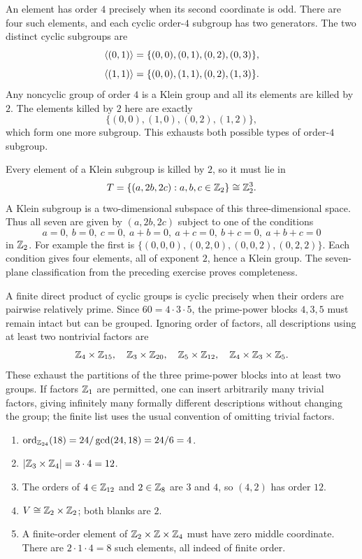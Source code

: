 An element has order $4$ precisely when its second coordinate is odd. There are four such elements, and each cyclic order-$4$ subgroup has two generators. The two distinct cyclic subgroups are
\[\langle (0,1)\rangle=\{(0,0),(0,1),(0,2),(0,3)\},\]
\[\langle (1,1)\rangle=\{(0,0),(1,1),(0,2),(1,3)\}.\]
Any noncyclic group of order $4$ is a Klein group and all its elements are killed by $2$. The elements killed by $2$ here are exactly
\[\{(0,0),(1,0),(0,2),(1,2)\},\]
which form one more subgroup. This exhausts both possible types of order-$4$ subgroup.

Every element of a Klein subgroup is killed by $2$, so it must lie in
\[T=\{(a,2b,2c):a,b,c\in\mathbb{Z}_2\}\cong\mathbb{Z}_2^3.\]
A Klein subgroup is a two-dimensional subspace of this three-dimensional space. Thus all seven are given by $(a,2b,2c)$ subject to one of the conditions
\[a=0,\ b=0,\ c=0,\ a+b=0,\ a+c=0,\ b+c=0,\ a+b+c=0\]
in $\mathbb{Z}_2$. For example the first is $\{(0,0,0),(0,2,0),(0,0,2),(0,2,2)\}$. Each condition gives four elements, all of exponent $2$, hence a Klein group. The seven-plane classification from the preceding exercise proves completeness.

A finite direct product of cyclic groups is cyclic precisely when their orders are pairwise relatively prime. Since $60=4\cdot3\cdot5$, the prime-power blocks $4,3,5$ must remain intact but can be grouped. Ignoring order of factors, all descriptions using at least two nontrivial factors are
\[\mathbb{Z}_4\times\mathbb{Z}_{15},\quad\mathbb{Z}_3\times\mathbb{Z}_{20},\quad\mathbb{Z}_5\times\mathbb{Z}_{12},\quad\mathbb{Z}_4\times\mathbb{Z}_3\times\mathbb{Z}_5.\]
These exhaust the partitions of the three prime-power blocks into at least two groups. If factors $\mathbb{Z}_1$ are permitted, one can insert arbitrarily many trivial factors, giving infinitely many formally different descriptions without changing the group; the finite list uses the usual convention of omitting trivial factors.

\begin{enumerate}[label=(\alph*)]
\item $\operatorname{ord}_{\mathbb{Z}_{24}}(18)=24/\gcd(24,18)=24/6=4$.
\item $|\mathbb{Z}_3\times\mathbb{Z}_4|=3\cdot4=12$.
\item The orders of $4\in\mathbb{Z}_{12}$ and $2\in\mathbb{Z}_8$ are $3$ and $4$, so $(4,2)$ has order $12$.
\item $V\cong\mathbb{Z}_2\times\mathbb{Z}_2$; both blanks are $2$.
\item A finite-order element of $\mathbb{Z}_2\times\mathbb{Z}\times\mathbb{Z}_4$ must have zero middle coordinate. There are $2\cdot1\cdot4=8$ such elements, all indeed of finite order.
\end{enumerate}

